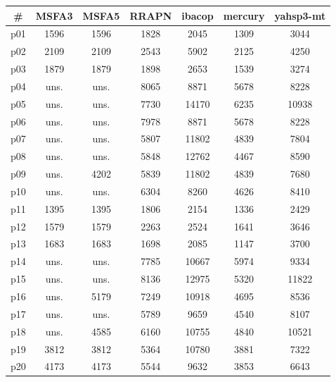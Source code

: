 \begin{tabular}{ccccccc}
\toprule
\textbf{\#} & \textbf{MSFA3} & \textbf{MSFA5} & \textbf{RRAPN} & \textbf{ibacop} & \textbf{mercury} & \textbf{yahsp3-mt}\\
\midrule
p01 & 1596 & 1596 & 1828 & 2045 & 1309 & 3044\\
p02 & 2109 & 2109 & 2543 & 5902 & 2125 & 4250\\
p03 & 1879 & 1879 & 1898 & 2653 & 1539 & 3274\\
p04 & uns. & uns. & 8065 & 8871 & 5678 & 8228\\
p05 & uns. & uns. & 7730 & 14170 & 6235 & 10938\\
p06 & uns. & uns. & 7978 & 8871 & 5678 & 8228\\
p07 & uns. & uns. & 5807 & 11802 & 4839 & 7804\\
p08 & uns. & uns. & 5848 & 12762 & 4467 & 8590\\
p09 & uns. & 4202 & 5839 & 11802 & 4839 & 7680\\
p10 & uns. & uns. & 6304 & 8260 & 4626 & 8410\\
p11 & 1395 & 1395 & 1806 & 2154 & 1336 & 2429\\
p12 & 1579 & 1579 & 2263 & 2524 & 1641 & 3646\\
p13 & 1683 & 1683 & 1698 & 2085 & 1147 & 3700\\
p14 & uns. & uns. & 7785 & 10667 & 5974 & 9334\\
p15 & uns. & uns. & 8136 & 12975 & 5320 & 11822\\
p16 & uns. & 5179 & 7249 & 10918 & 4695 & 8536\\
p17 & uns. & uns. & 5789 & 9659 & 4540 & 8107\\
p18 & uns. & 4585 & 6160 & 10755 & 4840 & 10521\\
p19 & 3812 & 3812 & 5364 & 10780 & 3881 & 7322\\
p20 & 4173 & 4173 & 5544 & 9632 & 3853 & 6643\\
\bottomrule
\end{tabular}

